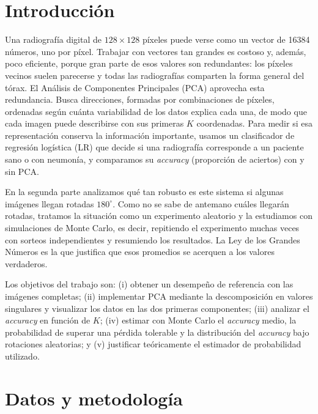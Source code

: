 \documentclass[11pt,a4paper]{article}
\newcommand{\acc}{\emph{accuracy}}
\begin{document}
\section{Introducción}
Una radiografía digital de $128\times128$ píxeles puede verse como un vector de 16384 números, uno por
píxel. Trabajar con vectores tan grandes es costoso y, además, poco eficiente, porque gran parte de esos
valores son redundantes: los píxeles vecinos suelen parecerse y todas las radiografías comparten la forma
general del tórax. El Análisis de Componentes Principales (PCA) aprovecha esta redundancia. Busca
direcciones, formadas por combinaciones de píxeles, ordenadas según cuánta variabilidad de los datos
explica cada una, de modo que cada imagen puede describirse con sus primeras $K$ coordenadas. Para medir si
esa representación conserva la información importante, usamos un clasificador de regresión logística (LR)
que decide si una radiografía corresponde a un paciente sano o con neumonía, y comparamos su \acc{}
(proporción de aciertos) con y sin PCA.

En la segunda parte analizamos qué tan robusto es este sistema si algunas imágenes llegan rotadas $180^\circ$.
Como no se sabe de antemano cuáles llegarán rotadas, tratamos la situación como un experimento aleatorio y
la estudiamos con simulaciones de Monte Carlo, es decir, repitiendo el experimento muchas veces con sorteos
independientes y resumiendo los resultados. La Ley de los Grandes Números es la que justifica que esos
promedios se acerquen a los valores verdaderos.

Los objetivos del trabajo son: (i) obtener un desempeño de referencia con las imágenes completas;
(ii) implementar PCA mediante la descomposición en valores singulares y visualizar los datos en las dos
primeras componentes; (iii) analizar el \acc{} en función de $K$; (iv) estimar con Monte Carlo el \acc{}
medio, la probabilidad de superar una pérdida tolerable y la distribución del \acc{} bajo rotaciones
aleatorias; y (v) justificar teóricamente el estimador de probabilidad utilizado.

\section{Datos y metodología}
\end{document}
